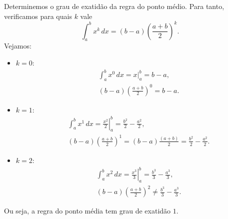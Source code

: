 \begin{ex}
  Determinemos o grau de exatidão da regra do ponto médio. Para tanto, verificamos para quais $k$ vale
  \begin{equation}
    \int_a^b x^k\,dx = (b-a)\left(\frac{a+b}{2}\right)^k.
  \end{equation}
Vejamos:
\begin{itemize}
\item $k=0$:
  \begin{align}
    &\int_a^b x^0\,dx = \left. x\right|_a^b = b-a,\\
    &(b-a)\left(\frac{a+b}{2}\right)^0 = b-a.
  \end{align}
\item $k=1$:
  \begin{align}
    &\int_a^b x^1\,dx = \left. \frac{x^2}{2}\right|_a^b = \frac{b^2}{2}-\frac{a^2}{2},\\
    &(b-a)\left(\frac{a+b}{2}\right)^1 = (b-a)\frac{(a+b)}{2} = \frac{b^2}{2}-\frac{a^2}{2}.
  \end{align}
\item $k=2$:
  \begin{align}
    &\int_a^b x^2\,dx = \left. \frac{x^3}{3}\right|_a^b = \frac{b^3}{3}-\frac{a^3}{3},\\
    &(b-a)\left(\frac{a+b}{2}\right)^2 \neq \frac{b^3}{3}-\frac{a^3}{3}.
  \end{align}
\end{itemize}
Ou seja, a regra do ponto média tem grau de exatidão $1$.
\end{ex}

